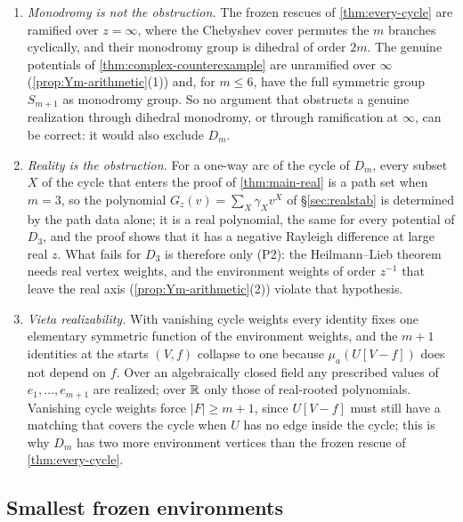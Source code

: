 \begin{remark}\label{rem:monodromy}
\begin{enumerate}[label=(\arabic*)]
\item \emph{Monodromy is not the obstruction.} The frozen rescues of \cref{thm:every-cycle} are ramified over $z=\infty$, where the Chebyshev cover permutes the $m$ branches cyclically, and their monodromy group is dihedral of order $2m$. The genuine potentials of \cref{thm:complex-counterexample} are unramified over $\infty$ (\cref{prop:Ym-arithmetic}(1)) and, for $m\le6$, have the full symmetric group $S_{m+1}$ as monodromy group. So no argument that obstructs a genuine realization through dihedral monodromy, or through ramification at $\infty$, can be correct: it would also exclude $D_m$.
\item \emph{Reality is the obstruction.} For a one-way arc of the cycle of $D_m$, every subset $X$ of the cycle that enters the proof of \cref{thm:main-real} is a path set when $m=3$, so the polynomial $G_z(v)=\sum_X\gamma_Xv^{X}$ of \S\ref{sec:realstab} is determined by the path data alone; it is a real polynomial, the same for every potential of $D_3$, and the proof shows that it has a negative Rayleigh difference at large real $z$. What fails for $D_3$ is therefore only \textup{(P2)}: the Heilmann--Lieb theorem needs real vertex weights, and the environment weights of order $z^{-1}$ that leave the real axis (\cref{prop:Ym-arithmetic}(2)) violate that hypothesis.
\item \emph{Vieta realizability.} With vanishing cycle weights every identity fixes one elementary symmetric function of the environment weights, and the $m+1$ identities at the starts $(V,f)$ collapse to one because $\mu_a(U[V-f])$ does not depend on $f$. Over an algebraically closed field any prescribed values of $e_1,\dots,e_{m+1}$ are realized; over $\mathbb{R}$ only those of real-rooted polynomials. Vanishing cycle weights force $|F|\ge m+1$, since $U[V-f]$ must still have a matching that covers the cycle when $U$ has no edge inside the cycle; this is why $D_m$ has two more environment vertices than the frozen rescue of \cref{thm:every-cycle}.
\end{enumerate}
\end{remark}

\subsection{Smallest frozen environments}

